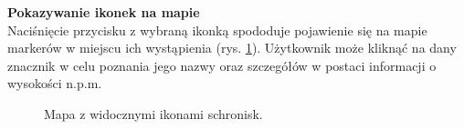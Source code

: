 \noindent
\textbf{Pokazywanie ikonek na mapie} \\
\indent Naciśnięcie przycisku z wybraną ikonką spododuje pojawienie się na mapie markerów w miejscu ich wystąpienia (rys. \ref{widok:ikony}). Użytkownik może kliknąć na dany znacznik w celu poznania jego nazwy oraz szczegółów w postaci informacji o wysokości n.p.m.
\noindent
\begin{figure}[H]
    \centering
    \caption{Mapa z widocznymi ikonami schronisk.}
    \label{widok:ikony}
\end{figure}


